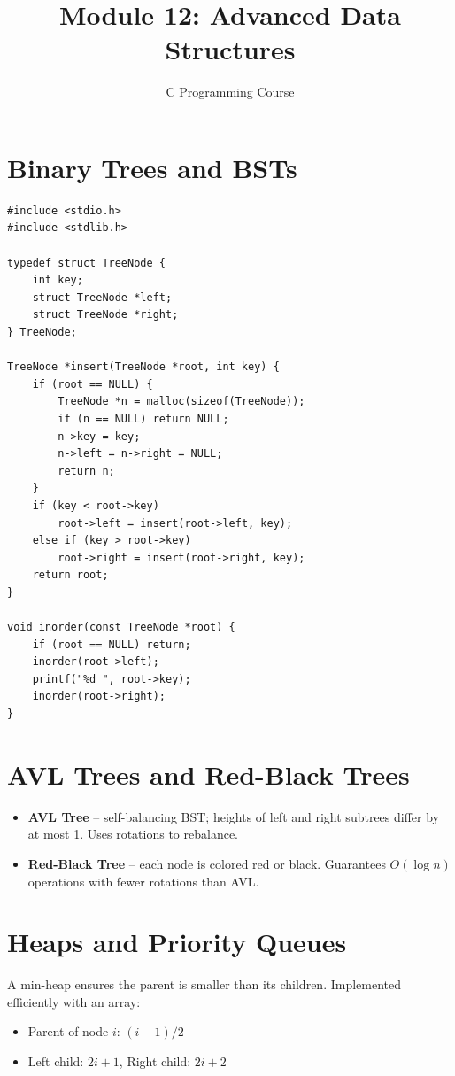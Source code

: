 \documentclass[11pt,a4paper]{article}
\title{Module 12: Advanced Data Structures}
\author{C Programming Course}
\date{}
\begin{document}
\maketitle
\thispagestyle{fancy}

\section{Binary Trees and BSTs}
\begin{lstlisting}
#include <stdio.h>
#include <stdlib.h>

typedef struct TreeNode {
    int key;
    struct TreeNode *left;
    struct TreeNode *right;
} TreeNode;

TreeNode *insert(TreeNode *root, int key) {
    if (root == NULL) {
        TreeNode *n = malloc(sizeof(TreeNode));
        if (n == NULL) return NULL;
        n->key = key;
        n->left = n->right = NULL;
        return n;
    }
    if (key < root->key)
        root->left = insert(root->left, key);
    else if (key > root->key)
        root->right = insert(root->right, key);
    return root;
}

void inorder(const TreeNode *root) {
    if (root == NULL) return;
    inorder(root->left);
    printf("%d ", root->key);
    inorder(root->right);
}
\end{lstlisting}

\section{AVL Trees and Red-Black Trees}
\begin{itemize}
  \item \textbf{AVL Tree} -- self-balancing BST; heights of left and right
    subtrees differ by at most 1. Uses rotations to rebalance.
  \item \textbf{Red-Black Tree} -- each node is colored red or black.
    Guarantees $O(\log n)$ operations with fewer rotations than AVL.
\end{itemize}

\section{Heaps and Priority Queues}
A min-heap ensures the parent is smaller than its children.
Implemented efficiently with an array:
\begin{itemize}
  \item Parent of node $i$: $(i - 1) / 2$
  \item Left child: $2i + 1$, Right child: $2i + 2$
\end{itemize}
\end{document}
